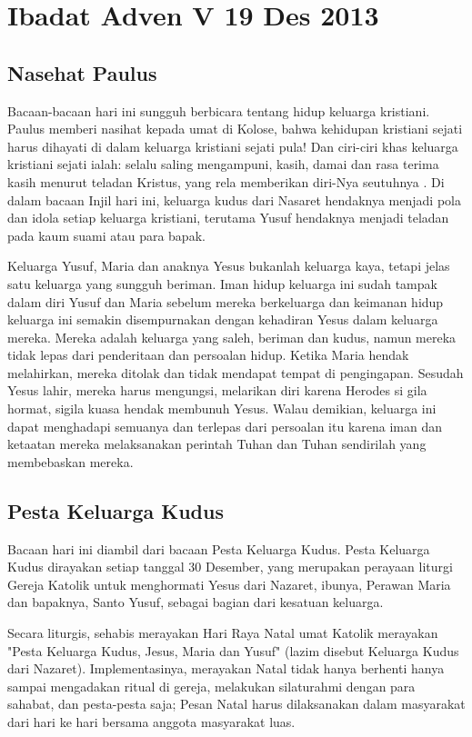 \documentclass[12pt,a4paper]{article}
\begin{document}
\section*{Ibadat Adven V 19 Des 2013}

\subsection*{Nasehat Paulus}
Bacaan-bacaan hari ini sungguh berbicara tentang hidup keluarga kristiani. Paulus memberi nasihat kepada umat di Kolose, bahwa kehidupan kristiani sejati harus dihayati di dalam keluarga kristiani sejati pula! Dan ciri-ciri khas keluarga kristiani sejati ialah: selalu saling mengampuni, kasih, damai dan rasa terima kasih menurut teladan Kristus, yang rela memberikan diri-Nya seutuhnya . Di dalam bacaan Injil hari ini, keluarga kudus dari Nasaret hendaknya menjadi pola dan idola setiap keluarga kristiani, terutama Yusuf hendaknya menjadi teladan pada kaum suami atau para bapak.

Keluarga Yusuf, Maria dan anaknya Yesus bukanlah keluarga kaya, tetapi jelas satu keluarga yang sungguh beriman. Iman hidup keluarga ini sudah tampak dalam diri Yusuf dan Maria sebelum mereka berkeluarga dan keimanan hidup keluarga ini semakin disempurnakan dengan kehadiran Yesus dalam keluarga mereka. Mereka adalah keluarga yang saleh, beriman dan kudus, namun mereka tidak lepas dari penderitaan dan persoalan hidup. Ketika Maria hendak melahirkan, mereka ditolak dan tidak mendapat tempat di pengingapan. Sesudah Yesus lahir, mereka harus mengungsi, melarikan diri karena Herodes si gila hormat, sigila kuasa hendak membunuh Yesus. Walau demikian, keluarga ini dapat menghadapi semuanya dan terlepas dari persoalan itu karena iman dan ketaatan mereka melaksanakan perintah Tuhan dan Tuhan sendirilah yang membebaskan mereka.

\subsection*{Pesta Keluarga Kudus}
Bacaan hari ini diambil dari bacaan Pesta Keluarga Kudus.
Pesta Keluarga Kudus dirayakan setiap tanggal 30 Desember, yang merupakan perayaan liturgi Gereja Katolik untuk menghormati Yesus dari Nazaret, ibunya, Perawan Maria dan bapaknya, Santo Yusuf, sebagai bagian dari kesatuan keluarga.

Secara liturgis, sehabis merayakan Hari Raya Natal umat Katolik merayakan "Pesta Keluarga Kudus, Jesus, Maria dan Yusuf" (lazim disebut Keluarga Kudus dari Nazaret). Implementasinya, merayakan Natal tidak hanya berhenti hanya sampai mengadakan ritual di gereja, melakukan silaturahmi dengan para sahabat, dan pesta-pesta saja; Pesan Natal harus dilaksanakan dalam masyarakat dari hari ke hari bersama anggota masyarakat luas.
\end{document}
